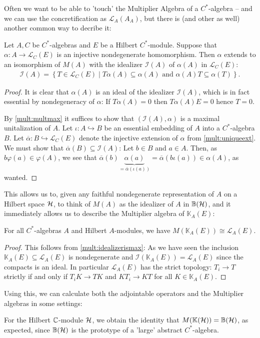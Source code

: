 Often we want to be able to 'touch' the Multiplier Algebra of a $C^*$-algebra -- and we can use the concretification as $\mathcal{L}_A(A_A)$, but there is (and other as well) another common way to decribe it:
\begin{proposition}
	Let $A,C$ be $C^*$-algebras and $E$ be a Hilbert $C^*$-module. Suppose that $\alpha \colon A \to \mathcal{L}_C(E)$ is an injective nondegenerate homomorphism. Then $\alpha$ extends to an isomorphism of $M(A)$ with the idealizer $\mathcal{I}(A)$ of $\alpha(A)$ in $\mathcal{L}_C(E)$:
	\begin{align*}
		\mathcal{I}(A)=\left\{ T \in \mathcal{L}_C(E) \mid T\alpha(A) \subseteq \alpha(A) \text{ and } \alpha(A)T \subseteq \alpha(T) \right\}.	
	\end{align*}
	\label{mult:idealizerismax}
\end{proposition}
\begin{proof}
	It is clear that $\alpha(A)$ is an ideal of the idealizer $\mathcal{I}(A)$, which is in fact essential by nondegeneracy of $\alpha$: If $T\alpha(A) = 0$ then $T\alpha(A)E = 0$ hence $T =0$.

By \ref{mult:multmax} it suffices to show that $(\mathcal{I}(A),\alpha)$ is a maximal unitalization of $A$. Let $\iota \colon A \hookrightarrow B$ be an essential embedding of $A$ into a $C^*$-algebra $B$. Let $\overline \alpha \colon B \hookrightarrow \mathcal{L}_C(E)$ denote the injective extension of $\alpha$ from \ref{mult:uniqueext}. We must show that $\overline \alpha(B) \subseteq \mathcal{I}(A)$: Let $b \in B$ and $a \in A$. Then, as $b \varphi(a) \in \varphi(A)$, we see that $\overline \alpha(b) \underbrace{\alpha(a)}_{=\overline \alpha (\iota(a))} = \overline \alpha(b \iota(a)) \in \alpha(A)$, as wanted.
\end{proof}

This allows us to, given any faithful nondegenerate representation of $A$ on a Hilbert space $\mathcal{H}$, to think of $M(A)$ as the idealizer of $A$ in $\mathbb{B}(\mathcal{H})$, and it immediately allows us to describe the Multiplier algebra of $\mathbb{K}_A(E)$:
\begin{corollary}
	For all $C^*$-algebras $A$ and Hilbert $A$-modules, we have $M(\mathbb{K}_A(E))\cong \mathcal{L}_A(E)$.
\end{corollary}
\begin{proof}
	This follows from \ref{mult:idealizerismax}: As we have seen the inclusion $\mathbb{K}_A(E) \subseteq \mathcal{L}_A(E)$ is nondegenerate and $\mathcal{I}(\mathbb{K}_A(E))=\mathcal{L}_A(E)$ since the compacts is an ideal. In particular $\mathcal{L}_A(E)$ has the strict topology: $T_i \to T$ strictly if and only if $T_iK \to TK$ and $KT_i \to KT$ for all $K \in \mathbb{K}_A(E)$.
\end{proof}
Using this, we can calculate both the adjointable operators and the Multiplier algebras in some settings:
\begin{example}
	For the Hilbert $\mathbb{C}$-module $\mathcal{H}$, we obtain the identity that $M(\mathbb{K}(\mathcal{H})) = \mathbb{B}(\mathcal{H})$, as expected, since $\mathbb{B}(\mathcal{H})$ is the prototype of a 'large' abstract $C^*$-algebra.
\end{example}


